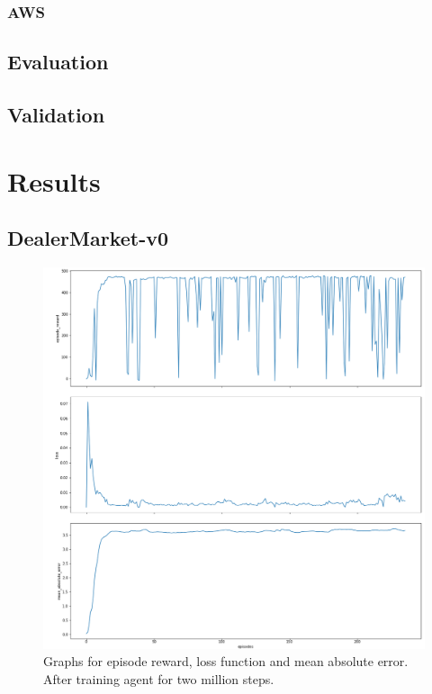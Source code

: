 \documentclass{kththesis}
\theoremstyle{definition}
\begin{document}
\subsection{AWS}

\section{Evaluation}

\section{Validation}

\chapter{Results}

\section{DealerMarket-v0}

\begin{figure}[H]
    \centering
    \includegraphics[scale=.4]{test_Exim_v3_2M.png}
    \caption{Graphs for episode reward, loss function and mean absolute error. After training agent for two million steps.}
    \label{fig:dm1}
\end{figure}
\end{document}
